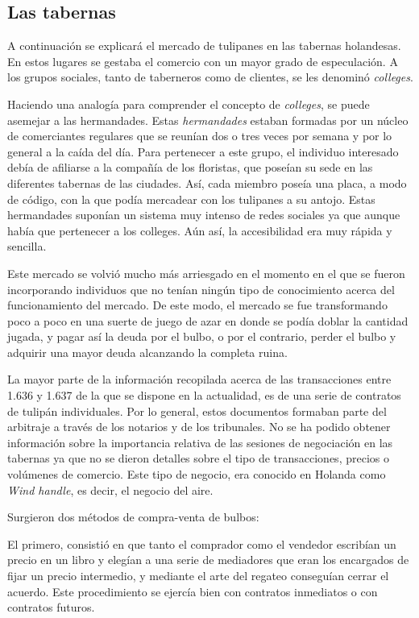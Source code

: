 \subsection{Las tabernas}

A continuación se explicará el mercado de tulipanes en las tabernas holandesas. En estos lugares se gestaba el comercio con un mayor grado de especulación. A los grupos sociales, tanto de taberneros como de clientes, se les denominó \emph{colleges}.

Haciendo una analogía para comprender el concepto de \emph{colleges}, se puede asemejar a las hermandades. Estas \emph{hermandades} estaban formadas por un núcleo de comerciantes regulares que se reunían dos o tres veces por semana y por lo general a la caída del día. Para pertenecer a este grupo, el individuo interesado debía de afiliarse a la compañía de los floristas, que poseían su sede en las diferentes tabernas de las ciudades. Así, cada miembro poseía una placa, a modo de código, con la que podía mercadear con los tulipanes a su antojo. Estas hermandades suponían un sistema muy intenso de redes sociales ya que aunque había que pertenecer a los colleges. Aún así, la accesibilidad era muy rápida y sencilla.

Este mercado se volvió mucho más arriesgado en el momento en el que se fueron incorporando individuos que no tenían ningún tipo de conocimiento acerca del funcionamiento del mercado. De este modo, el mercado se fue transformando poco a poco en una suerte de juego de azar en donde se podía doblar la cantidad jugada, y pagar así la deuda por el bulbo, o por el contrario, perder el bulbo y adquirir una mayor deuda alcanzando la completa ruina.

La mayor parte de la información recopilada acerca de las transacciones entre 1.636 y 1.637 de la que se dispone en la actualidad, es de una serie de contratos de tulipán individuales. Por lo general, estos documentos formaban parte del arbitraje a través de los notarios y de los tribunales. No se ha podido obtener información sobre la importancia relativa de las sesiones de negociación en las tabernas ya que no se dieron detalles sobre el tipo de transacciones, precios o volúmenes de comercio. Este tipo de negocio, era conocido en Holanda como \emph{Wind handle}, es decir, el negocio del aire.

Surgieron dos métodos de compra-venta de bulbos:

El primero, consistió en que tanto el comprador como el vendedor escribían un precio en un libro y elegían a una serie de mediadores que eran los encargados de fijar un precio intermedio, y mediante el arte del regateo conseguían cerrar el acuerdo. Este procedimiento se ejercía bien con contratos inmediatos o con contratos futuros.

